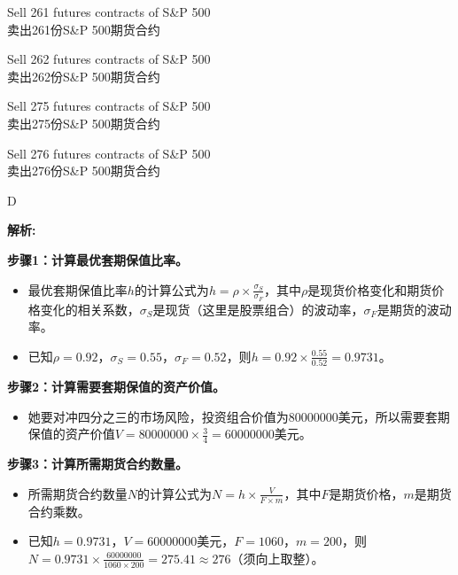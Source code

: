 \documentclass{article}
\newenvironment{explanation}
{\textbf{解析:}\par}
{\par}
\begin{document}
    \begin{choices}
        \item Sell 261 futures contracts of S\&P 500\\
        卖出261份S\&P 500期货合约
        \item Sell 262 futures contracts of S\&P 500\\
        卖出262份S\&P 500期货合约
        \item Sell 275 futures contracts of S\&P 500\\
        卖出275份S\&P 500期货合约
        \item Sell 276 futures contracts of S\&P 500\\
        卖出276份S\&P 500期货合约
    \end{choices}
    
    \begin{correctanswer}
        D
    \end{correctanswer}
    
    \begin{explanation}
    \textbf{步骤1：计算最优套期保值比率。}
    \begin{itemize}
        \item 最优套期保值比率\(h\)的计算公式为\(h=\rho\times\frac{\sigma_S}{\sigma_F}\)，其中\(\rho\)是现货价格变化和期货价格变化的相关系数，\(\sigma_S\)是现货（这里是股票组合）的波动率，\(\sigma_F\)是期货的波动率。
        \item 已知\(\rho = 0.92\)，\(\sigma_S=0.55\)，\(\sigma_F = 0.52\)，则\(h = 0.92\times\frac{0.55}{0.52}=0.9731\)。
    \end{itemize}
    \textbf{步骤2：计算需要套期保值的资产价值。}
    \begin{itemize}
        \item 她要对冲四分之三的市场风险，投资组合价值为\(80000000\)美元，所以需要套期保值的资产价值\(V = 80000000\times\frac{3}{4}=60000000\)美元。
    \end{itemize}
    \textbf{步骤3：计算所需期货合约数量。}
    \begin{itemize}
        \item 所需期货合约数量\(N\)的计算公式为\(N=h\times\frac{V}{F\times m}\)，其中\(F\)是期货价格，\(m\)是期货合约乘数。
        \item 已知\(h=0.9731\)，\(V = 60000000\)美元，\(F = 1060\)，\(m = 200\)，则\(N=0.9731\times\frac{60000000}{1060\times200}=275.41\approx276\)（须向上取整）。
    \end{itemize}
    \end{explanation}
    
\end{document}
